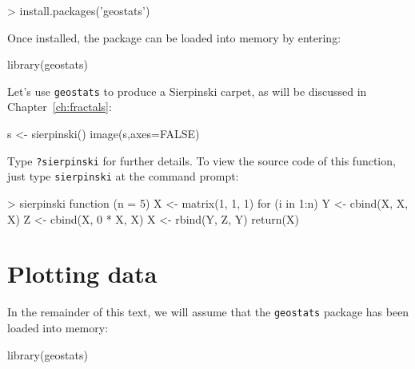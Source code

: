 \begin{enumerate}
\begin{console}
> install.packages('geostats')
\end{console}

Once installed, the package can be loaded into memory by entering:

\begin{script}
library(geostats)
\end{script}

Let's use \texttt{geostats} to produce a Sierpinski carpet, as will be
discussed in Chapter~\ref{ch:fractals}:

\begin{script}[firstnumber=2]
s <- sierpinski()
image(s,axes=FALSE)
\end{script}

Type \texttt{?sierpinski} for further details. To view the source code
of this function, just type \texttt{sierpinski} at the command prompt:

\begin{console}
> sierpinski
function (n = 5){
    X <- matrix(1, 1, 1)
    for (i in 1:n) {
        Y <- cbind(X, X, X)
        Z <- cbind(X, 0 * X, X)
        X <- rbind(Y, Z, Y)
    }
    return(X)
}
\end{console}

\end{enumerate}

\section{Plotting data}
\label{sec:R-plotting}

In the remainder of this text, we will assume that the
\texttt{geostats} package has been loaded into memory:

\begin{console}
library(geostats)
\end{console}

